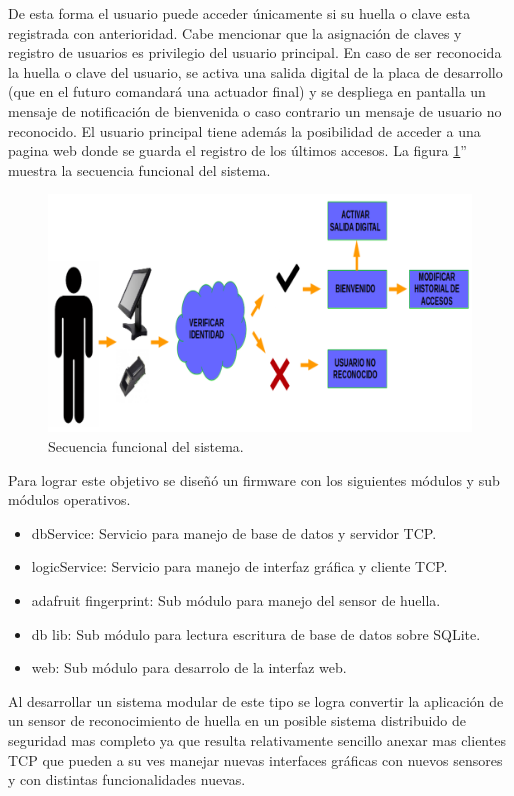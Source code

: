 De esta forma el usuario puede acceder únicamente si su huella  o clave esta registrada con anterioridad. Cabe mencionar que la asignación de claves y registro de usuarios es privilegio del usuario principal.
En caso de ser reconocida la huella o clave del usuario, se activa una salida digital de la placa de desarrollo (que en el futuro comandará una actuador final) y se despliega en pantalla un mensaje de notificación de bienvenida o caso contrario un mensaje de usuario no reconocido.
El usuario principal tiene además la posibilidad de acceder a una pagina web donde se guarda el registro de los últimos accesos.
La figura \ref{fig:funcional}'' muestra la secuencia funcional del sistema.

\begin{figure}[h]
	\centering
	\includegraphics[scale=.3]{./Figures/funcional.png}
	\caption{Secuencia funcional del sistema.}
	\label{fig:funcional}
\end{figure}

Para lograr este objetivo se diseñó un firmware con los siguientes módulos y sub módulos operativos.

\begin{itemize}
\item dbService: Servicio para manejo de base de datos y servidor TCP.	
\item logicService: Servicio para manejo de interfaz gráfica y cliente TCP.
\item adafruit fingerprint: Sub módulo para manejo del sensor de huella.
\item db lib: Sub módulo para lectura escritura de base de datos sobre SQLite.
\item web: Sub módulo para desarrolo de la interfaz web.
\end{itemize}
 
Al desarrollar un sistema modular de este tipo se logra convertir la aplicación de un sensor de reconocimiento de huella en un posible sistema distribuido de seguridad mas completo ya que resulta relativamente sencillo anexar mas clientes TCP que pueden a su ves manejar nuevas interfaces gráficas con nuevos sensores y con distintas funcionalidades nuevas.

